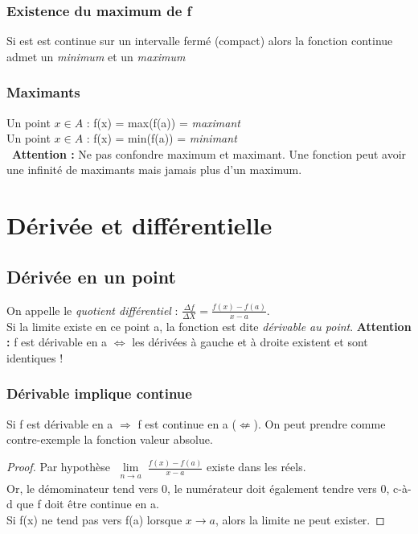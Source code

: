 \documentclass[11pt, a4paper, openany]{book}
\begin{document}
\subsection{Existence du maximum de f}
Si est est continue sur un intervalle fermé (compact) alors la fonction continue admet un \textit{minimum} et un \textit{maximum}

\subsection{Maximants}
Un point $x \in A$ : f(x) = max(f(a)) = \textit{maximant}\\
Un point $x \in A$ : f(x) = min(f(a)) = \textit{minimant}\\\
\textbf{Attention :} Ne pas confondre maximum et maximant. Une fonction peut avoir une infinité de maximants mais jamais plus d'un maximum.



\chapter{Dérivée et différentielle}
\section{Dérivée en un point}
On appelle le \textit{quotient différentiel} : $\frac{\Delta f}{\Delta X} = \frac{f(x) - f(a)}{x - a}$. \\
Si la limite existe en ce point a, la fonction est dite \textit{dérivable au point}.
\textbf{Attention :} f est dérivable en a $\Leftrightarrow$ les dérivées à gauche et à droite existent et sont identiques !

\subsection*{Dérivable implique continue}
Si f est dérivable en a $\Rightarrow$ f est continue en a ($\nLeftarrow$). On peut prendre comme contre-exemple la fonction valeur absolue. 

\begin{proof}
	Par hypothèse $\lim\limits_{\substack{n \to a}} \frac{f(x)-f(a)}{x-a}$ existe dans les réels.\\
	Or, le démominateur tend vers 0, le numérateur doit également tendre vers 0, c-à-d que f doit être continue en a.\\
	Si f(x) ne tend pas vers f(a) lorsque $x \rightarrow a $, alors la limite ne peut exister.
\end{proof}
\end{document}
